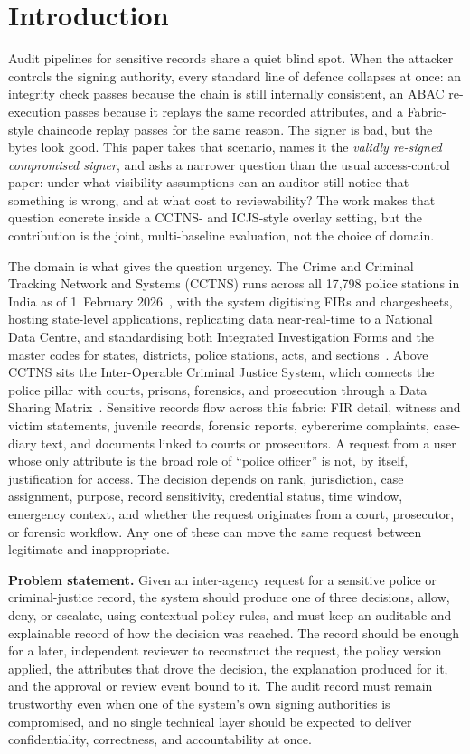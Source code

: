 \section{Introduction}

Audit pipelines for sensitive records share a quiet blind spot. When the
attacker controls the signing authority, every standard line of defence
collapses at once: an integrity check passes because the chain is still
internally consistent, an ABAC re-execution passes because it replays the
same recorded attributes, and a Fabric-style chaincode replay passes for
the same reason. The signer is bad, but the bytes look good. This paper
takes that scenario, names it the \emph{validly re-signed compromised
signer}, and asks a narrower question than the usual access-control paper:
under what visibility assumptions can an auditor still notice that
something is wrong, and at what cost to reviewability? The work makes that
question concrete inside a CCTNS- and ICJS-style overlay setting, but the
contribution is the joint, multi-baseline evaluation, not the choice of
domain.

The domain is what gives the question urgency. The Crime and Criminal
Tracking Network and Systems (CCTNS) runs across all 17{,}798 police
stations in India as of 1~February 2026~\cite{pib_cctns_2026}, with the
system digitising FIRs and chargesheets, hosting state-level applications,
replicating data near-real-time to a National Data Centre, and
standardising both Integrated Investigation Forms and the master codes for
states, districts, police stations, acts, and sections~\cite{pib_cctns_2026}.
Above CCTNS sits the Inter-Operable Criminal Justice System, which connects
the police pillar with courts, prisons, forensics, and prosecution through
a Data Sharing Matrix~\cite{mha_icjs_2026}. Sensitive records flow across
this fabric: FIR detail, witness and victim statements, juvenile records,
forensic reports, cybercrime complaints, case-diary text, and documents
linked to courts or prosecutors. A request from a user whose only attribute
is the broad role of ``police officer'' is not, by itself, justification
for access. The decision depends on rank, jurisdiction, case assignment,
purpose, record sensitivity, credential status, time window, emergency
context, and whether the request originates from a court, prosecutor, or
forensic workflow. Any one of these can move the same request between
legitimate and inappropriate.

\noindent\textbf{Problem statement.} Given an inter-agency request for a
sensitive police or criminal-justice record, the system should produce one
of three decisions, allow, deny, or escalate, using contextual policy
rules, and must keep an auditable and explainable record of how the
decision was reached. The record should be enough for a later, independent
reviewer to reconstruct the request, the policy version applied, the
attributes that drove the decision, the explanation produced for it, and
the approval or review event bound to it. The audit record must remain
trustworthy even when one of the system's own signing authorities is
compromised, and no single technical layer should be expected to deliver
confidentiality, correctness, and accountability at once.

